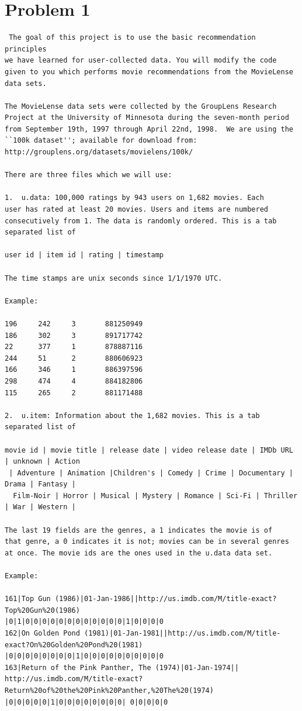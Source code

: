  
\section{Problem 1}
\label{part1}
\begin{verbatim}
 The goal of this project is to use the basic recommendation principles
we have learned for user-collected data. You will modify the code
given to you which performs movie recommendations from the MovieLense
data sets.

The MovieLense data sets were collected by the GroupLens Research
Project at the University of Minnesota during the seven-month period
from September 19th, 1997 through April 22nd, 1998.  We are using the 
``100k dataset''; available for download from:
http://grouplens.org/datasets/movielens/100k/

There are three files which we will use:

1.  u.data: 100,000 ratings by 943 users on 1,682 movies. Each
user has rated at least 20 movies. Users and items are numbered
consecutively from 1. The data is randomly ordered. This is a tab
separated list of 

user id | item id | rating | timestamp

The time stamps are unix seconds since 1/1/1970 UTC.

Example:

196     242     3       881250949
186     302     3       891717742
22      377     1       878887116
244     51      2       880606923
166     346     1       886397596
298     474     4       884182806
115     265     2       881171488

2.  u.item: Information about the 1,682 movies. This is a tab
separated list of

movie id | movie title | release date | video release date | IMDb URL | unknown | Action
 | Adventure | Animation |Children's | Comedy | Crime | Documentary | Drama | Fantasy |
  Film-Noir | Horror | Musical | Mystery | Romance | Sci-Fi | Thriller | War | Western |

The last 19 fields are the genres, a 1 indicates the movie is of
that genre, a 0 indicates it is not; movies can be in several genres
at once. The movie ids are the ones used in the u.data data set.

Example:

161|Top Gun (1986)|01-Jan-1986||http://us.imdb.com/M/title-exact?Top%20Gun%20(1986)
|0|1|0|0|0|0|0|0|0|0|0|0|0|0|1|0|0|0|0 
162|On Golden Pond (1981)|01-Jan-1981||http://us.imdb.com/M/title-exact?On%20Golden%20Pond%20(1981)
|0|0|0|0|0|0|0|0|1|0|0|0|0|0|0|0|0|0|0 
163|Return of the Pink Panther, The (1974)|01-Jan-1974||
http://us.imdb.com/M/title-exact?Return%20of%20the%20Pink%20Panther,%20The%20(1974)
|0|0|0|0|0|1|0|0|0|0|0|0|0|0| 0|0|0|0|0


\end{verbatim}
